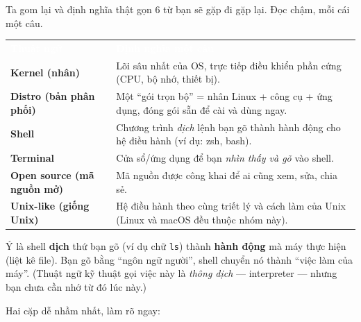 \documentclass[12pt,a4paper]{article}
\begin{document}
Ta gom lại và định nghĩa thật gọn 6 từ bạn sẽ gặp đi gặp lại. Đọc chậm, mỗi cái một câu.

\renewcommand{\arraystretch}{1.4}
\begin{longtable}{>{\raggedright\arraybackslash}p{4cm}>{\raggedright\arraybackslash}p{10.5cm}}
\rowcolor{tblhead}\textcolor{white}{\textbf{Thuật ngữ}} & \textcolor{white}{\textbf{Định nghĩa một câu}} \\
\rowcolor{tblrow}\textbf{Kernel (nhân)} & Lõi sâu nhất của OS, trực tiếp điều khiển phần cứng (CPU, bộ nhớ, thiết bị). \\
\textbf{Distro (bản phân phối)} & Một ``gói trọn bộ'' = nhân Linux + công cụ + ứng dụng, đóng gói sẵn để cài và dùng ngay. \\
\rowcolor{tblrow}\textbf{Shell} & Chương trình \textit{dịch} lệnh bạn gõ thành hành động cho hệ điều hành (ví dụ: zsh, bash). \\
\textbf{Terminal} & Cửa sổ/ứng dụng để bạn \textit{nhìn thấy và gõ} vào shell. \\
\rowcolor{tblrow}\textbf{Open source (mã nguồn mở)} & Mã nguồn được công khai để ai cũng xem, sửa, chia sẻ. \\
\textbf{Unix-like (giống Unix)} & Hệ điều hành theo cùng triết lý và cách làm của Unix (Linux và macOS đều thuộc nhóm này). \\
\end{longtable}

\begin{notebox}
Ý là shell \textbf{dịch} thứ bạn gõ (ví dụ chữ \texttt{ls}) thành \textbf{hành động} mà máy thực hiện (liệt kê file). Bạn gõ bằng ``ngôn ngữ người'', shell chuyển nó thành ``việc làm của máy''. (Thuật ngữ kỹ thuật gọi việc này là \textit{thông dịch} — interpreter — nhưng bạn chưa cần nhớ từ đó lúc này.)
\end{notebox}

Hai cặp dễ nhầm nhất, làm rõ ngay:
\end{document}
